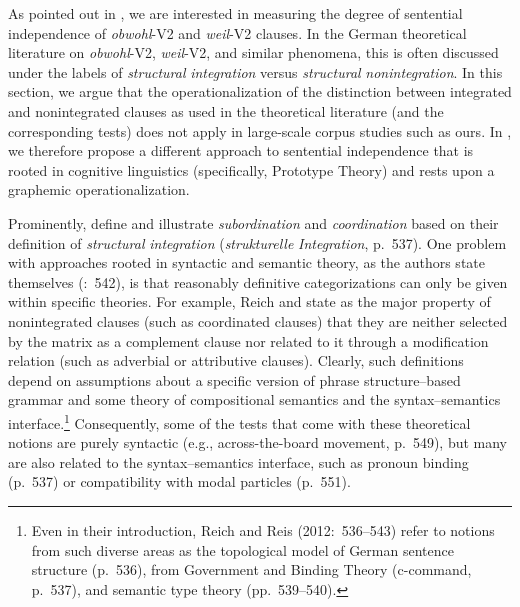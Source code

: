 \begin{styleMoutonText}
As pointed out in , we are interested in measuring the degree of sentential independence of \textit{obwohl}{}-V2 and \textit{weil}{}-V2 clauses. In the German theoretical literature on \textit{obwohl}{}-V2, \textit{weil}{}-V2, and similar phenomena, this is often discussed under the labels of \textit{structural} \textit{integration} versus \textit{structural} \textit{nonintegration}. In this section, we argue that the operationalization of the distinction between integrated and nonintegrated clauses as used in the theoretical literature (and the corresponding tests) does not apply in large-scale corpus studies such as ours. In , we therefore propose a different approach to sentential independence that is rooted in cognitive linguistics (specifically, Prototype Theory) and rests upon a graphemic operationalization.
\end{styleMoutonText}

\begin{styleMoutonText}
Prominently, \citet{ReichReis2012} define and illustrate \textit{subordination} and \textit{coordination} based on their definition of \textit{structural} \textit{integration} (\textit{strukturelle} \textit{Integration}, p.~537). One problem with approaches rooted in syntactic and semantic theory, as the authors state themselves (\citealt{ReichReis2012}:~542), is that reasonably definitive categorizations can only be given within specific theories. For example, Reich and \citet[551]{Reis2012} state as the major property of nonintegrated clauses (such as coordinated clauses) that they are neither selected by the matrix as a complement clause nor related to it through a modification relation (such as adverbial or attributive clauses). Clearly, such definitions depend on assumptions about a specific version of phrase structure–based grammar and some theory of compositional semantics and the syntax–semantics interface.\footnote{Even in their introduction, Reich and Reis (2012:~536–543) refer to notions from such diverse areas as the topological model of German sentence structure (p.~536), from Government and Binding Theory (c-command, p.~537), and semantic type theory (pp.~539–540).} Consequently, some of the tests that come with these theoretical notions are purely syntactic (e.g., across-the-board movement, p.~549), but many are also related to the syntax–semantics interface, such as pronoun binding (p.~537) or compatibility with modal particles (p.~551).
\end{styleMoutonText}

